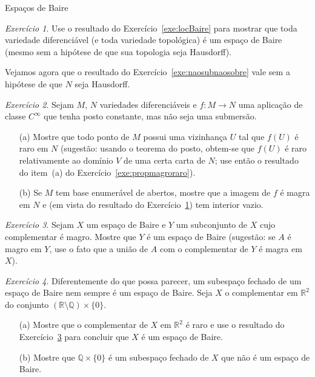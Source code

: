 \documentclass[oneside,11pt]{amsart}
\newcommand{\R}{\mathds R}
\newcommand{\Q}{\mathds Q}
\theoremstyle{remark}\newtheorem{exercise}{Exercício}[section]
\theoremstyle{plain}\newtheorem{teo}{Teorema}[section]
\theoremstyle{plain}\newtheorem{lem}[teo]{Lema}
\theoremstyle{plain}\newtheorem{prop}[teo]{Proposição}
\theoremstyle{definition}\newtheorem{defin}[teo]{Definição}
\theoremstyle{remark}\newtheorem{rem}[teo]{Observação}
\theoremstyle{definition}\newtheorem{example}[teo]{Exemplo}
\numberwithin{equation}{section}
\begin{document}
\begin{section}{Espaços de Baire}
\begin{exercise}\label{exe:variedadeBaire}
Use o resultado do Exercício~\ref{exe:locBaire} para mostrar que toda variedade diferenciável (e toda variedade topológica) é um espaço de Baire (mesmo
sem a hipótese de que sua topologia seja Hausdorff).
\end{exercise}

Vejamos agora que o resultado do Exercício~\ref{exe:naosubnaosobre} vale sem a hipótese de que $N$ seja Hausdorff.
\begin{exercise}
Sejam $M$, $N$ variedades diferenciáveis e $f:M\to N$ uma aplicação de classe $C^\infty$ que tenha posto constante, mas não seja uma submersão.
\begin{itemize}
\item[(a)] Mostre que todo ponto de $M$ possui uma vizinhança $U$ tal que $f(U)$ é raro em $N$ (sugestão: usando o teorema do posto, obtem-se que
$f(U)$ é raro relativamente ao domínio $V$ de uma certa carta de $N$; use então o resultado do item~(a) do Exercício~\ref{exe:propmagroraro}).
\item[(b)] Se $M$ tem base enumerável de abertos, mostre que a imagem de $f$ é magra em $N$ e (em vista do resultado do Exercício~\ref{exe:variedadeBaire})
tem interior vazio.
\end{itemize}
\end{exercise}

\begin{exercise}\label{exe:genericoBaire}
Sejam $X$ um espaço de Baire e $Y$ um subconjunto de $X$ cujo complementar é magro. Mostre que $Y$ é um espaço de Baire (sugestão: se $A$ é magro em $Y$, use
o fato que a união de $A$ com o complementar de $Y$ é magra em $X$).
\end{exercise}

\begin{exercise}
Diferentemente do que possa parecer, um subespaço fechado de um espaço de Baire nem sempre é um espaço de Baire.
Seja $X$ o complementar em $\R^2$ do conjunto $(\R\setminus\Q)\times\{0\}$.
\begin{itemize}
\item[(a)] Mostre que o complementar de $X$ em $\R^2$ é raro e use o resultado do Exercício~\ref{exe:genericoBaire} para concluir que $X$ é um espaço de Baire.
\item[(b)] Mostre que $\Q\times\{0\}$ é um subespaço fechado de $X$ que não é um espaço de Baire.
\end{itemize}
\end{exercise}


\end{section}
\end{document}
